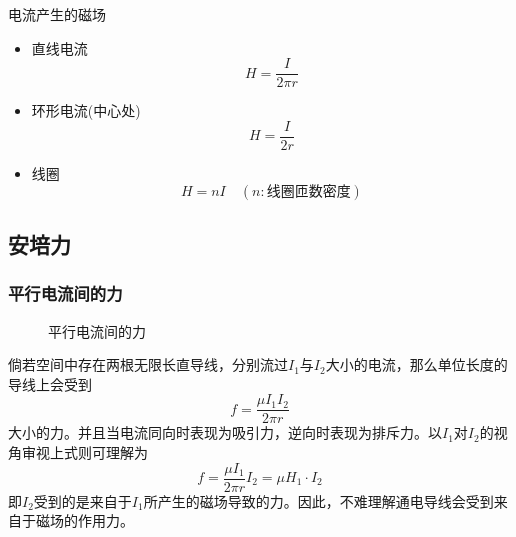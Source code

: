 \begin{itembox}[l]{电流产生的磁场}
    \begin{itemize}
        \item 直线电流
        \begin{equation*}
            H=\frac{I}{2\pi r}
        \end{equation*}
        \item 环形电流(中心处)
        \begin{equation*}
            H=\frac{I}{2r}
        \end{equation*}
        \item 线圈
        \begin{equation*}
            H=nI\quad(n:\textrm{线圈匝数密度})
        \end{equation*}
    \end{itemize}
\end{itembox}

\subsection{安培力}
\label{subsec:安培力}

\subsubsection{平行电流间的力}

\begin{figure}[ht!]
    \centering
    \caption{平行电流间的力}
\end{figure}
倘若空间中存在两根无限长直导线，分别流过$I_1$与$I_2$大小的电流，那么单位长度的导线上会受到
\begin{equation*}
    f=\frac{\mu I_1I_2}{2\pi r}
\end{equation*}
大小的力。并且当电流同向时表现为吸引力，逆向时表现为排斥力。以$I_1$对$I_2$的视角审视上式则可理解为
\begin{equation*}
    f=\frac{\mu I_1}{2\pi r}I_2=\mu H_1\cdot I_2
\end{equation*}
即$I_2$受到的是来自于$I_1$所产生的磁场导致的力。因此，不难理解通电导线会受到来自于磁场的作用力。

